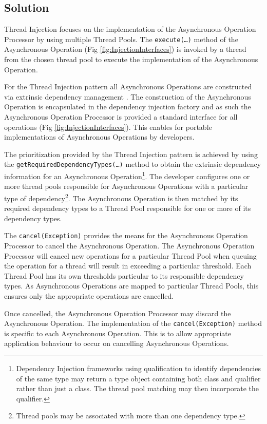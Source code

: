 \documentclass[prodmode]{style/acmlarge}
\begin{document}
\subsection{Solution}

Thread Injection focuses on the implementation of the Asynchronous Operation
Processor by using multiple Thread Pools.  The \texttt{execute(\ldots)} method
of the Asynchronous Operation (Fig \ref{fig:InjectionInterfaces}) is invoked by
a thread from the chosen thread pool to execute the implementation of the
Asynchronous Operation.

For the Thread Injection pattern all Asynchronous Operations are constructed via
extrinsic dependency management \cite{ioc}.  The construction of the
Asynchronous Operation is encapsulated in the dependency injection factory and
as such the Asynchronous Operation Processor is provided a standard interface
for all operations (Fig \ref{fig:InjectionInterfaces}).  This enables for
portable implementations of Asynchronous Operations by developers.

The prioritization provided by the Thread Injection pattern is achieved by using
the \texttt{getRequiredDependencyTypes(\ldots)} method to obtain the extrinsic
dependency information for an Asynchronous Operation\footnote{Dependency
Injection frameworks using qualification to identify dependencies of the same
type may return a type object containing both class and qualifier rather than
just a class.  The thread pool matching may then incorporate the qualifier.}. 
The developer configures one or more thread pools responsible for Asynchronous
Operations with a particular type of dependency\footnote{Thread pools may be
associated with more than one dependency type.}.  The Asynchronous Operation is
then matched by its required dependency types to a Thread Pool responsible for
one or more of its dependency types.

The \texttt{cancel(Exception)} provides the means for the Asynchronous Operation
Processor to cancel the Asynchronous Operation.  The Asynchronous Operation
Processor will cancel new operations for a particular Thread Pool when queuing
the operation for a thread will result in exceeding a particular threshold. 
Each Thread Pool has its own thresholds particular to its responsible dependency
types.  As Asynchronous Operations are mapped to particular Thread Pools, this
ensures only the appropriate operations are cancelled.

Once cancelled, the Asynchronous Operation Processor may discard the
Asynchronous Operation.  The implementation of the \texttt{cancel(Exception)}
method is specific to each Asynchronous Operation.  This is to allow appropriate
application behaviour to occur on cancelling Asynchronous Operations.
\end{document}

